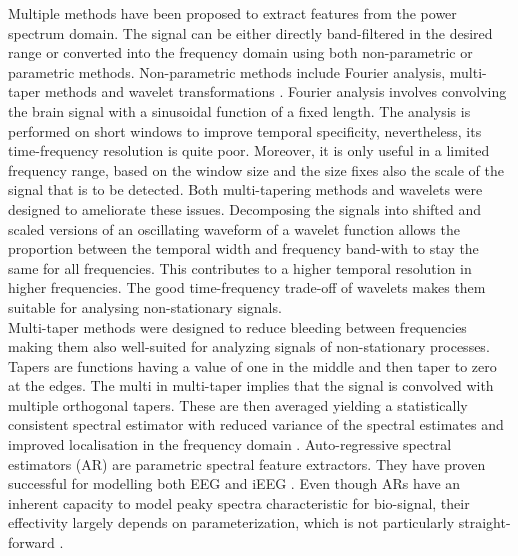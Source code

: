  Multiple methods have been proposed to extract features from the power spectrum domain. 
 The signal can be either directly band-filtered in the desired range or converted into the frequency domain using both non-parametric or parametric methods. 
 Non-parametric methods include Fourier analysis, multi-taper methods and wavelet transformations \cite{36-vugt-2007}. 
 Fourier analysis involves convolving the brain signal with a sinusoidal function of a fixed length. The analysis is performed on short windows to improve temporal specificity, nevertheless, its time-frequency resolution is quite poor.
 Moreover, it is only useful in a limited frequency range, based on the window size and the size fixes also the scale of the signal that is to be detected. 
Both multi-tapering methods and wavelets were designed to ameliorate these issues. 
Decomposing the signals into shifted and scaled versions of an oscillating waveform of a wavelet function allows the proportion between the temporal width and frequency band-with to stay the same for all frequencies. 
This contributes to a higher temporal resolution in higher frequencies. The good time-frequency trade-off of wavelets makes them suitable for analysing non-stationary signals.  \\

Multi-taper methods were designed to reduce bleeding between frequencies making them also well-suited for analyzing signals of non-stationary processes. 
Tapers are functions having a value of one in the middle and then taper to zero at the edges. 
The multi in multi-taper implies that the signal is convolved with multiple orthogonal tapers.
These are then averaged yielding a statistically consistent spectral estimator with reduced variance of the spectral estimates and improved localisation in the frequency domain \cite{multitaper-31}. 
Auto-regressive spectral estimators (AR) are parametric spectral feature extractors. They have proven successful for modelling both EEG \cite{auto-regressive-eeg} and iEEG \cite{anderson-offline-2009}. 
Even though ARs have an inherent capacity to model peaky spectra characteristic for bio-signal, their effectivity largely depends on parameterization, which is not particularly straight-forward \cite{anderson-offline-2009}. \\

